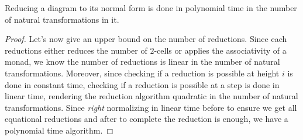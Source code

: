 \begin{theorem}
	\label{thm:norm}
	Reducing a diagram to its normal form is done in polynomial time in
	the number of natural transformations in it.
\end{theorem}
\begin{proof}
	Let's now give an upper bound on the number of reductions.
	Since each reductions either reduces the number of $2$-cells or applies the
	associativity of a monad, we know the number of reductions is linear in the
	number of natural transformations.
	Moreover, since checking if a reduction is possible at height $i$ is done in
	constant time, checking if a reduction is possible at a step is done in
	linear time, rendering the reduction algorithm quadratic in the number of
	natural transformations.
	Since \emph{right} normalizing in linear time before to ensure we get all
	equational reductions and after to complete the reduction is enough,
	we have a polynomial time algorithm.
\end{proof}
